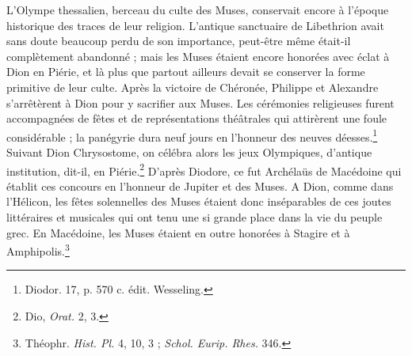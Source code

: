 \documentclass[landscape, a4paper, 11pt, oneside, polutonikogreek, french]{article}
\begin{document}
L'Olympe thessalien, berceau du culte des Muses, conservait encore à l'époque historique des traces de leur religion. L'antique sanctuaire de Libethrion avait sans doute beaucoup perdu de son importance, peut-être même était-il complètement abandonné ; mais les Muses étaient encore honorées avec éclat à Dion en Piérie, et là plus que partout ailleurs devait se conserver la forme primitive de leur culte. Après la victoire de Chéronée, Philippe et Alexandre s'arrêtèrent à Dion pour y sacrifier aux Muses. Les cérémonies religieuses furent accompagnées de fêtes et de représentations théâtrales qui attirèrent une foule considérable ; la panégyrie dura neuf jours en l'honneur des neuves déesses.\footnote{Diodor. 17, p. 570 c. édit. Wesseling.} Suivant Dion Chrysostome, on célébra alors les jeux Olympiques, d'antique institution, dit-il, en Piérie.\footnote{Dio, \emph{Orat.} 2, 3.} D'après Diodore, ce fut Archélaüs de Macédoine qui établit ces concours en l'honneur de Jupiter et des Muses. A Dion, comme dans l'Hélicon, les fêtes solennelles des Muses étaient donc inséparables de ces joutes littéraires et musicales qui ont tenu une si grande place dans la vie du peuple grec. En Macédoine, les Muses étaient en outre honorées à Stagire et à Amphipolis.\footnote{Théophr. \emph{Hist. Pl.} 4, 10, 3 ; \emph{Schol. Eurip. Rhes.} 346.}
\end{document}
